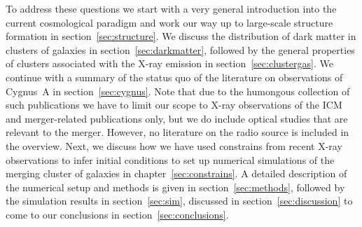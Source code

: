 \documentclass[MScProj_TLRH_ClusterEnergy.tex]{subfiles}
\begin{document}
To address these questions we start with a very general introduction into the 
current cosmological paradigm and work our way up to large-scale structure 
formation in section~\ref{sec:structure}. We discuss the distribution of dark 
matter in clusters of galaxies in section~\ref{sec:darkmatter}, followed by 
the general properties of clusters associated with the X-ray emission in 
section~\ref{sec:clustergas}. We continue with a summary of the status quo of 
the literature on observations of Cygnus~A in section~\ref{sec:cygnus}. 
Note that due to the humongous collection of such publications we have to limit
our scope to X-ray observations of the ICM and merger-related publications only, 
but we do include optical studies that are relevant to the merger. However,
no literature on the radio source is included in the overview. Next, we discuss 
how we have used constrains from recent X-ray observations to infer initial 
conditions to set up numerical simulations of the merging cluster of galaxies in
chapter~\ref{sec:constrains}. A detailed description of the numerical setup and 
methods is given in section~\ref{sec:methods}, followed by the simulation results 
in section~\ref{sec:sim}, discussed in section~\ref{sec:discussion} to come 
to our conclusions in section~\ref{sec:conclusions}.



\setcounter{tocdepth}{2} %
\setcounter{secnumdepth}{3} %

\tableofcontents

\SubfileBibliography
\end{document}
